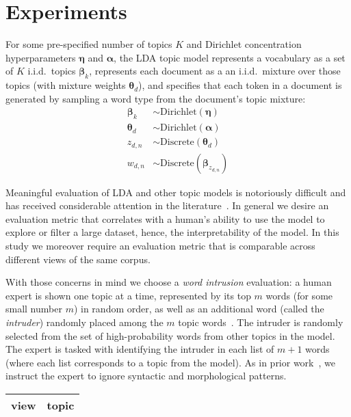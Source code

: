 \documentclass[11pt,letterpaper]{article}
\renewcommand{\vec}{\boldsymbol}   %
\newcommand{\valpha}{{\vec{\alpha}}}
\newcommand{\vtheta}{{\vec{\theta}}}
\newcommand{\veta}{{\vec{\eta}}}
\newcommand{\vbeta}{{\vec{\beta}}}
\newcommand{\Discrete}{\ensuremath{\mathrm{Discrete}}}
\newcommand{\Dirichlet}{\ensuremath{\mathrm{Dirichlet}}}
\begin{document}
{\section{Experiments}\label{sec:experiments}

For some pre-specified
number of topics $K$ and Dirichlet concentration hyperparameters
$\veta$ and $\valpha$, the LDA topic model represents a vocabulary as a
set of $K$ i.i.d.\ topics $\vbeta_k$, represents each document as a
an i.i.d.\ mixture over those topics (with mixture weights
$\vtheta_d$), and specifies that each token in a document is
generated by sampling a word type from the document's topic mixture:
\begin{align*}
    \vbeta_k  & \sim \Dirichlet\left(\veta\right) \\
    \vtheta_d & \sim \Dirichlet\left(\valpha\right) \\
    z_{d,n}              & \sim \Discrete\left(\vtheta_d\right) \\
    w_{d,n}              & \sim \Discrete\left(\vbeta_{z_{d,n}}\right)
\end{align*}

Meaningful evaluation of LDA and other topic models is notoriously
difficult and has received considerable attention in the
literature~\cite{chang2009,wallach2009a,newman2010,mimno2011}.
In general we desire an evaluation metric that correlates with a
human's ability to use the model to explore or filter a large dataset,
hence, the interpretability of the model.  In this study we moreover
require an evaluation metric that is comparable across different views
of the same corpus.

With those concerns in mind we choose a \emph{word intrusion}
evaluation:
a human expert is shown one topic at a time, represented
by its top $m$ words (for some small number $m$) in random order, as
well as an additional word (called the \emph{intruder}) randomly placed
among the $m$ topic words~\cite{chang2009}.
The intruder is randomly selected from the set of high-probability
words from other topics in the model.
The expert is tasked with identifying the intruder in each list of
$m + 1$ words (where each list corresponds to a topic from the model).
As in prior work~\cite{chang2009}, we instruct the expert to ignore
syntactic and morphological patterns.

\begin{table*}
    \centering
    \begin{tabular}{l|l}
        view & topic \\\hline


\end{tabular}
\end{table*}}
\end{document}
